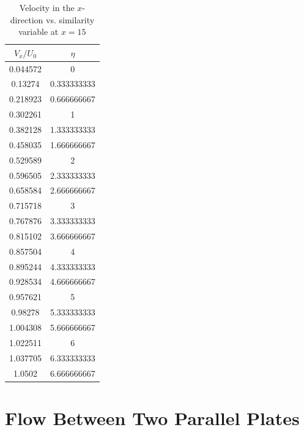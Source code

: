 \begin{table}
\label{table1}
\caption{Velocity in the $x$-direction vs. similarity variable at $x = 15$}
\begin{center}
\begin{tabular}{c|c}
\hline
$V_x/U_0$  &  $\eta$\\
\hline
0.044572&	0\\
0.13274	& 0.333333333\\
0.218923&	0.666666667\\
0.302261&	1\\
0.382128&	1.333333333\\
0.458035&	1.666666667\\
0.529589&	2\\
0.596505&	2.333333333\\
0.658584&	2.666666667\\
0.715718&	3\\
0.767876&	3.333333333\\
0.815102&	3.666666667\\
0.857504&	4\\
0.895244&	4.333333333\\
0.928534&	4.666666667\\
0.957621&	5\\
0.98278	& 5.333333333\\
1.004308&	5.666666667\\
1.022511&	6\\
1.037705&	6.333333333\\
1.0502	& 6.666666667\\
\hline
\end{tabular}
\end{center}
\end{table}


\section{Flow Between Two Parallel Plates}

